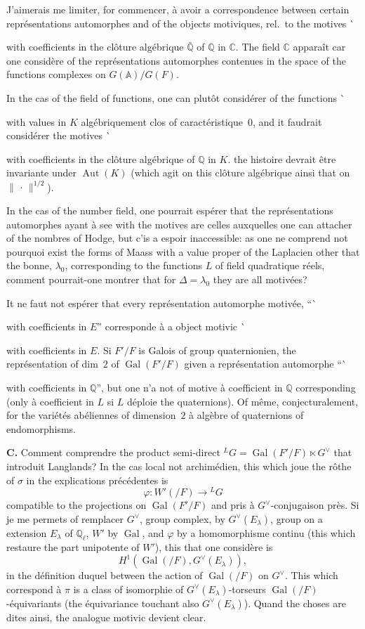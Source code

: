 \documentclass[11pt,a4paper]{article}
\theoremstyle{plain}
\theoremstyle{definition}
\DeclareMathOperator{\Gal}{Gal}
\DeclareMathOperator{\Aut}{Aut}
\newcommand{\norm}[1]{\lVert#1\rVert}
\begin{document}
{{{{{{J'aimerais me limiter, for commencer, \`{a} avoir a correspondence between certain repr\'{e}sentations automorphes and of the objects motiviques, rel.~to the motives \`{with coefficients in the cl\^{o}ture alg\'{e}brique $\bar{\mathbb Q}$ of $\mathbb Q$ in $\mathbb C$. The field $\mathbb C$ appara\^{i}t car one consid\`{e}re of the repr\'{e}sentations automorphes contenues in the space of the functions complexes on $G(\mathbb A)/G(F)$.

In the cas of the field of functions, one can plut\^{o}t consid\'{e}rer of the functions \`{with values in $K$ alg\'{e}briquement clos of caract\'{e}ristique~$0$, and it faudrait consid\'{e}rer the motives \`{with coefficients in the cl\^{o}ture alg\'{e}brique of $\mathbb Q$ in $K$. the histoire devrait \^{e}tre invariante under $\Aut(K)$ (which agit on this cl\^{o}ture alg\'{e}brique ainsi that on $\norm{\,\cdot\,}^{1/2}$).

In the cas of the number field, one pourrait esp\'{e}rer that the repr\'{e}sentations automorphes ayant \`{a} see with the motives are celles auxquelles one can attacher of the nombres of Hodge, but c'is a espoir inaccessible: as one ne comprend not pourquoi exist the forms of Maass with a value proper of the Laplacien other that the bonne, $\lambda_0$, corresponding to the functions $L$ of field quadratique r\'{e}els, comment pourrait-one montrer that for $\Delta = \lambda_0$ they are all motiv\'{e}es?

It ne faut not esp\'{e}rer that every repr\'{e}sentation automorphe motiv\'{e}e, ``\`{with coefficients in $E$'' corresponde \`{a} a object motivic \`{with coefficients in $E$. Si $F'/F$ is Galois of group quaternionien, the repr\'{e}sentation of dim~$2$ of $\Gal(F'/F)$ given a repr\'{e}sentation automorphe ``\`{with coefficients in $\mathbb Q$'', but one n'a not of motive \`{a} coefficient in $\mathbb Q$ corresponding (only \`{a} coefficient in $L$ si $L$ d\'{e}ploie the quaternions). Of m\^{e}me, conjecturalement, for the vari\'{e}t\'{e}s ab\'{e}liennes of dimension~$2$ \`{a} alg\`{e}bre of quaternions of endomorphisms.

\bigskip
\noindent \textbf{C.} Comment comprendre the product semi-direct ${}^LG = \Gal(F'/F) \ltimes G^\vee$ that introduit Langlands? In the cas local not archim\'{e}dien, this which joue the r\^{o}the of $\sigma$ in the explications pr\'{e}c\'{e}dentes is
\[
\varphi \colon W'(/F) \longrightarrow {}^LG
\]
compatible to the projections on $\Gal(F'/F)$ and pris \`{a} $G^\vee$-conjugaison pr\`{e}s. Si je me permets of remplacer $G^\vee$, group complex, by $G^\vee(E_\lambda)$, group on a extension $E_\lambda$ of $\mathbb Q_\ell$, $W'$ by $\Gal$, and $\varphi$ by a homomorphisme continu (this which restaure the part unipotente of $W'$), this that one consid\`{e}re is
\[
H^1(\Gal(/F), G^\vee(E_\lambda)),
\]
in the d\'{e}finition duquel between the action of $\Gal(/F)$ on $G^\vee$. This which correspond \`{a} $\pi$ is a class of isomorphie of $G^\vee(E_\lambda)$-torseurs $\Gal(/F)$-\'{e}quivariants (the \'{e}quivariance touchant also $G^\vee(E_\lambda)$). Quand the choses are dites ainsi, the analogue motivic devient clear.

}}}}}}}}}}}}
\end{document}
